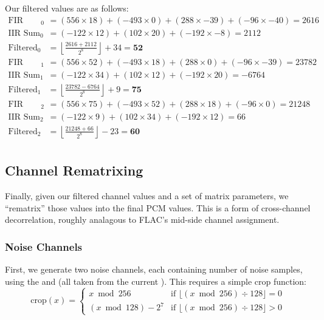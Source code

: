 \par
\noindent
Our filtered values are as follows:
\begin{align*}
\text{FIR Sum}_0 &= (556 \times 18) + (-493 \times 0) + (288 \times -39) + (-96 \times -40) = 2616 \\
\text{IIR Sum}_0 &= (-122 \times 12) + (102 \times 20) + (-192 \times -8) = 2112 \\
\text{Filtered}_0 &= \left\lfloor\frac{2616 + 2112}{2 ^ 8}\right\rfloor + 34 = \textbf{52} \\
\text{FIR Sum}_1 &= (556 \times 52) + (-493 \times 18) + (288 \times 0) + (-96 \times -39) = 23782 \\
\text{IIR Sum}_1 &= (-122 \times 34) + (102 \times 12) + (-192 \times 20) = -6764 \\
\text{Filtered}_1 &= \left\lfloor\frac{23782 - 6764}{2 ^ 8}\right\rfloor + 9 = \textbf{75} \\
\text{FIR Sum}_2 &= (556 \times 75) + (-493 \times 52) + (288 \times 18) + (-96 \times 0) = 21248 \\
\text{IIR Sum}_2 &= (-122 \times 9) + (102 \times 34) + (-192 \times 12) = 66 \\
\text{Filtered}_2 &= \left\lfloor\frac{21248 + 66}{2 ^ 8}\right\rfloor - 23 = \textbf{60} \\
\end{align*}

\clearpage

\subsection{Channel Rematrixing}

Finally, given our filtered channel values and a set of matrix parameters,
we ``rematrix'' those values into the final PCM values.
This is a form of cross-channel decorrelation, roughly analagous
to FLAC's mid-side channel assignment.

\subsubsection{Noise Channels}

First, we generate two noise channels, each containing
 number of noise samples, using the
 and  (all taken from the
current ).
This requires a simple crop function:
\begin{equation*}
\text{crop}(x) =
\begin{cases}
x \bmod{256} & \text{if } \lfloor (x \bmod{256}) \div 128\rfloor = 0 \\
(x \bmod{128}) - 2 ^ 7 & \text{if } \lfloor (x \bmod{256}) \div 128\rfloor > 0
\end{cases}
\end{equation*}


